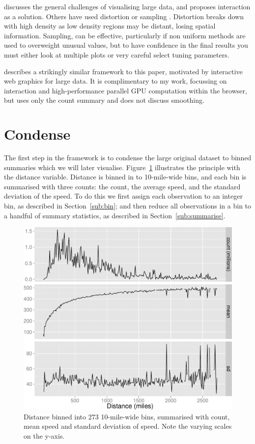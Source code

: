 \documentclass[journal]{vgtc}                %
\begin{document}
\citep{heer:2012} discusses the general challenges of visualising large data, and proposes interaction as a solution. Others have used distortion \citep{keim:2010} or sampling \citep{wegman:1995, bertini:2006a}. Distortion breaks down with high density as low density regions may be distant, losing spatial information. Sampling, can be effective, particularly if non uniform methods are used to overweight unusual values, but to have confidence in the final results you must either look at multiple plots or very careful select tuning parameters.

\citep{liu:2013} describes a strikingly similar framework to this paper, motivated by interactive web graphics for large data. It is complimentary to my work, focussing on interaction and high-performance parallel GPU computation within the browser, but uses only the count summary and does not discuss smoothing. 

\section{Condense}
\label{sec:condense}

The first step in the framework is to condense the large original dataset to binned summaries which we will later visualise. Figure~\ref{fig:condense} illustrates the principle with the distance variable. Distance is binned in to 10-mile-wide bins, and each bin is summarised with three counts: the count, the average speed, and the standard deviation of the speed. To do this we first assign each observation to an integer bin, as described in Section~\ref{sub:bin}; and then reduce all observations in a bin to a handful of summary statistics, as described in Section~\ref{sub:summarise}.

\begin{figure}[htb]
 \centering
 \includegraphics[width=\linewidth]{condense}
 \caption{Distance binned into 273 10-mile-wide bins, summarised with count, mean speed and standard deviation of speed. Note the varying scales on the y-axis.}
 \label{fig:condense}
\end{figure}
\end{document}
